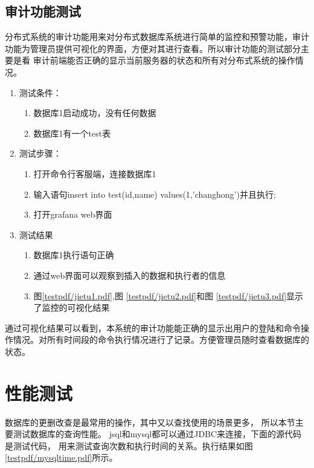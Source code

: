 \subsection{审计功能测试}
分布式系统的审计功能用来对分布式数据库系统进行简单的监控和预警功能，审计功能为管理员提供可视化的界面，方便对其进行查看。所以审计功能的测试部分主要是看
审计前端能否正确的显示当前服务器的状态和所有对分布式系统的操作情况。
\begin{enumerate}
	\item 测试条件：
	\begin{enumerate}
		\item 数据库1启动成功，没有任何数据
		\item 数据库1有一个test表
	\end{enumerate}
	\item 测试步骤：
	\begin{enumerate}
		\item 打开命令行客服端，连接数据库1
		\item 输入语句insert into test(id,name) values(1,'changhong')并且执行;
		\item 打开grafana web界面
	\end{enumerate}
	\item 	测试结果
	\begin{enumerate}
		\item 数据库1执行语句正确
		\item 通过web界面可以观察到插入的数据和执行者的信息
		\item 图\ref{testpdf/jietu1.pdf},图
		\ref{testpdf/jietu2.pdf}和图
		\ref{testpdf/jietu3.pdf}显示了监控的可视化结果
	\end{enumerate}
\end{enumerate}	

 
 通过可视化结果可以看到，本系统的审计功能能正确的显示出用户的登陆和命令操作情况。对所有时间段的命令执行情况进行了记录。方便管理员随时查看数据库的状态。
\section{性能测试}
数据库的更删改查是最常用的操作，其中又以查找使用的场景更多，
所以本节主要测试数据库的查询性能。
jsql和mysql都可以通过JDBC来连接，下面的源代码是测试代码，
用来测试查询次数和执行时间的关系。执行结果如图\ref{testpdf/mysqltime.pdf}所示。

